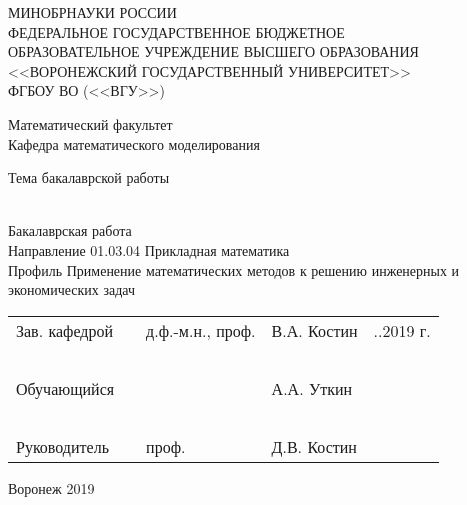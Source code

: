 \begin{titlepage}
    \begin{center}
        МИНОБРНАУКИ РОССИИ\\
        ФЕДЕРАЛЬНОЕ ГОСУДАРСТВЕННОЕ БЮДЖЕТНОЕ\\
        ОБРАЗОВАТЕЛЬНОЕ УЧРЕЖДЕНИЕ ВЫСШЕГО ОБРАЗОВАНИЯ\\
        <<ВОРОНЕЖСКИЙ ГОСУДАРСТВЕННЫЙ УНИВЕРСИТЕТ>>\\
        ФГБОУ ВО (<<ВГУ>>)
        \vskip 3cm

        Математический факультет\\
        Кафедра математического моделирования
        \vskip 3cm

        Тема бакалаврской работы\\
        ~\

        Бакалаврская работа\\
        Направление 01.03.04 Прикладная математика\\
        Профиль Применение математических методов к решению инженерных и экономических задач
        \vskip 3cm

        \begin{tabular}{l l l l l}
            Зав. кафедрой & \underline{\hspace{1.5cm}} & д.ф.-м.н., проф. & В.А. Костин &
            \underline{\hspace{0.5cm}}.\underline{\hspace{0.5cm}}.2019 г.\\
            ~\\
            Обучающийся & \underline{\hspace{1.5cm}} & & А.А. Уткин &\\
            ~\\
            Руководитель & \underline{\hspace{1.5cm}} & проф. & Д.В. Костин &
        \end{tabular}

        \vskip 5cm
        Воронеж 2019
    \end{center}
\end{titlepage}

